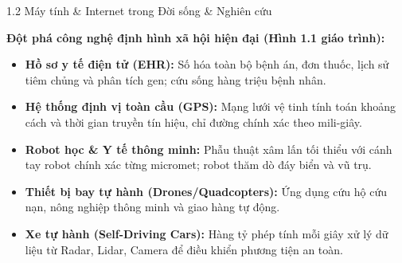 \documentclass[aspectratio=169, 10pt]{beamer}
\begin{document}
\begin{frame}{1.2 Máy tính \& Internet trong Đời sống \& Nghiên cứu}
  \begin{block}{\textbf{Đột phá công nghệ định hình xã hội hiện đại (Hình 1.1 giáo trình):}}
    \begin{itemize}
      \item \textbf{Hồ sơ y tế điện tử (EHR):} Số hóa toàn bộ bệnh án, đơn thuốc, lịch sử tiêm chủng và phân tích gen; cứu sống hàng triệu bệnh nhân.
      \item \textbf{Hệ thống định vị toàn cầu (GPS):} Mạng lưới vệ tinh tính toán khoảng cách và thời gian truyền tín hiệu, chỉ đường chính xác theo mili-giây.
      \item \textbf{Robot học \& Y tế thông minh:} Phẫu thuật xâm lấn tối thiểu với cánh tay robot chính xác từng micromet; robot thăm dò đáy biển và vũ trụ.
      \item \textbf{Thiết bị bay tự hành (Drones/Quadcopters):} Ứng dụng cứu hộ cứu nạn, nông nghiệp thông minh và giao hàng tự động.
      \item \textbf{Xe tự hành (Self-Driving Cars):} Hàng tỷ phép tính mỗi giây xử lý dữ liệu từ Radar, Lidar, Camera để điều khiển phương tiện an toàn.
    \end{itemize}
  \end{block}
\end{frame}
\end{document}
